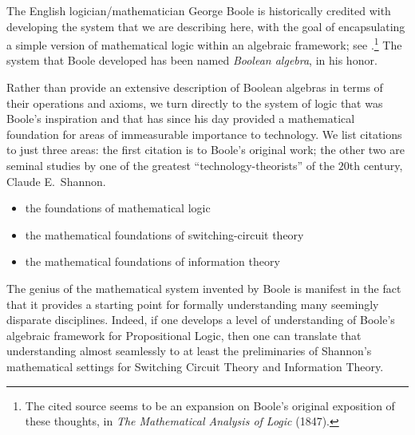The English logician/mathematician George Boole 
is historically credited with developing the system that we are
describing here, with the goal of encapsulating a simple version of
mathematical logic within an algebraic framework; see
\cite{Boole54}.\footnote{The cited source seems to be an expansion on
  Boole's original exposition of these thoughts, in {\it The
    Mathematical Analysis of Logic} (1847).}  The system that Boole
developed has been named {\it Boolean algebra}, in his honor.

Rather than provide an extensive description of Boolean algebras in
terms of their operations and axioms, we turn directly to the system
of logic that was Boole's inspiration and that has since his day
provided a mathematical foundation for areas of immeasurable
importance to technology.  We list citations to just three areas: the
first citation is to Boole's original work; the other two are seminal
studies by one of the greatest ``technology-theorists'' of the $20$th
century, Claude E.~Shannon. 
\begin{itemize}
\item
the foundations of mathematical logic \cite{Boole54}
\item
the mathematical foundations of switching-circuit theory
\cite{Shannon38}
\item
the mathematical foundations of information theory \cite{Shannon48}
\end{itemize}
The genius of the mathematical system invented by Boole is manifest in
the fact that it provides a starting point for formally understanding
many seemingly disparate disciplines.  Indeed, if one develops a level
of understanding of Boole's algebraic framework for Propositional
Logic, then one can translate that understanding almost seamlessly to
at least the preliminaries of Shannon's mathematical settings for
Switching Circuit Theory and Information Theory.
 



